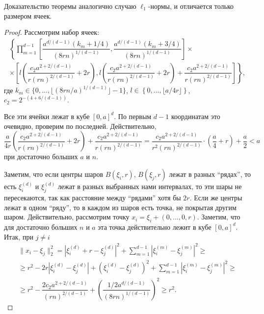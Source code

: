 \documentclass[12pt]{article}
\theoremstyle{plain}
\theoremstyle{definition}
\theoremstyle{remark}
\def\geq{\geqslant}
\begin{document}
Доказательство теоремы аналогично случаю $\ell_1$-нормы, и отличается только размером ячеек.
\begin{proof}
    Рассмотрим набор ячеек: 
    \begin{multline*}
        \left\{\prod\limits_{m=1}^{d-1}\left[\dfrac{a^{d/(d-1)}(k_m+1/4)}{(8rn)^{1/(d-1)}}, \dfrac{a^{d/(d-1)}(k_m+3/4)}{(8rn)^{1/(d-1)}}\right]\right.
    \times \\
    \times \left.\left[l\left(\dfrac{c_2a^{2 + 2/(d-1)}}{r(rn)^{2/(d-1)}} +2r\right) ,  l\left(\dfrac{c_2a^{2 + 2/(d-1)}}{r(rn)^{2/(d-1)}}+2r\right) + \dfrac{c_2a^{2 +2/(d-1)}}{r(rn)^{2/(d-1)}}  \right]\right\},
    \end{multline*}{}
    где $k_m \in \{0, \ldots, \lfloor (8rn/a)^{1/(d-1)}\rfloor-1\}$, $l\in \left\{0, \ldots, \lfloor a/4r\rfloor\right\}$, $c_2 = 2^{-(4+6/(d-1))}$. 
    
    Все эти ячейки лежат в кубе $[0,a]^d$. По первым $d-1$ координатам это очевидно, проверим по последней. Действительно, 
    \begin{equation*}
        \dfrac{a}{4r}\left(\dfrac{c_2a^{2 + 2/(d-1)}}{r(rn)^{2/(d-1)}}+2r\right) + \dfrac{c_2a^{2 +2/(d-1)}}{r(rn)^{2/(d-1)}} 
        =\dfrac{c_2a^{2+ 2/(d-1)}}{r^2(rn)^{2/(d-1)}}\cdot\left(\dfrac{a}{4} + r\right) + \dfrac{a}{2} 
        < a
    \end{equation*}{}
    при достаточно больших $a$ и $n$.
    
    Заметим, что если центры шаров $B(\xi_i, r)$, $B(\xi_j, r)$ лежат в разных ``рядах'', то есть $\xi_i^{(d)}$ и $\xi_j^{(d)}$ лежат в разных выбранных нами интервалах, то эти шары не пересекаются, так как расстояние между ``рядами'' хотя бы $2r$. Если же центры лежат в одном ``ряду'', то в каждом из шаров есть точка, не покрытая другим шаром. Действительно, рассмотрим точку  $x_i = \xi_i + (0, \ldots, 0, r)$. Заметим, что для достаточно больших $n$ и $a$ эта точка действительно лежит в кубе $[0, a]^d$. Итак, при $j \not= i$
        \begin{multline*}
        \|x_i - \xi_j\|^2_2 = 
        |\xi_i^{(d)} + r - \xi_j^{(d)} |^2 + \sum_{m=1}^{d-1}|\xi_i^{(m)} - \xi_j^{(m)}|^2 \geq\\
        \geq r^2 - 2r|\xi_i^{(d)} - \xi_j^{(d)}| + (\xi_i^{(d)} - \xi_j^{(d)})^2  + \sum_{m=1}^{d-1}|\xi_i^{(m)} - \xi_j^{(m)}|^2 \geq \\
        \geq r^2 - \dfrac{2c_2a^{2+2/(d-1)}}{(rn)^{2/(d-1)}} + \left(\dfrac{1/2a^{d/(d-1)}}{(8rn)^{1/(d-1)}}\right)^2 \geq r^2.
    \end{multline*}{}
    

\end{proof}
\end{document}
